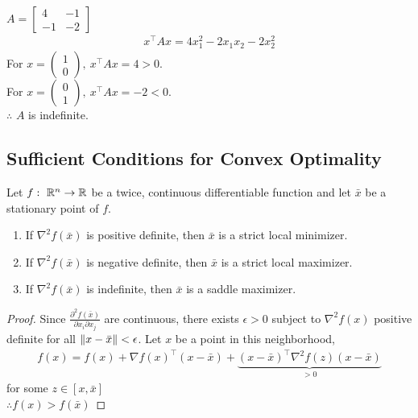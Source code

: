 \documentclass[11pt]{article}
\numberwithin{equation}{section}
\begin{document}
\begin{example}
    $A=\left[\begin{array}{cc}
        4 & -1 \\
        -1 & -2
        \end{array}\right]$ \begin{align*}
            x^{\top} A x=4 x_{1}^{2}-2 x_{1} x_{2}-2 x_{2}^{2}
        \end{align*}
        For $x=\left(\begin{array}{l}1 \\ 0\end{array}\right),\ x^{\top} A x= 4>0$. \\
        For $x=\left(\begin{array}{l}0 \\ 1\end{array}\right),\  x^{\top} A x=-2<0$. \\
        $\therefore$ $A$ is indefinite.
\end{example}

\subsection{Sufficient Conditions for Convex Optimality}
\begin{theorem}
    Let $f: \ \mathbb R^n \rightarrow \mathbb R$ be a twice, continuous differentiable function and let $\bar{x}$ be a stationary point of $f$.\begin{enumerate}
        \item If $\nabla^2 f(\bar{x})$ is positive definite, then $\bar{x}$ is a strict local minimizer.
        \item If $\nabla^2 f(\bar{x})$ is negative definite, then $\bar{x}$ is a strict local maximizer.
        \item If $\nabla^2 f(\bar{x})$ is indefinite, then $\bar{x}$ is a saddle maximizer.
    \end{enumerate}
    \begin{proof}
        Since $\frac{ \partial^2 f(\bar{x}) }{ \partial x_i \partial x_j }$ are continuous, there exists $\epsilon > 0$ subject to $\nabla^2 f(x)$ positive definite for all $\left\| x-\bar{x} \right\|<\epsilon$.
        Let $x$ be a point in this neighborhood, \begin{align*}
            f(x)=f(x)+\nabla f(x)^{\top}(x-\bar{x})  + \underbrace{(x-\bar{x})^{\top} \nabla^2 f(z)(x-\bar{x})}_{>0}
        \end{align*}
        for some $z \in \left[ x,\bar{x} \right]$\\
        $\therefore f(x) > f(\bar{x})$
    \end{proof}
\end{theorem}
\end{document}
